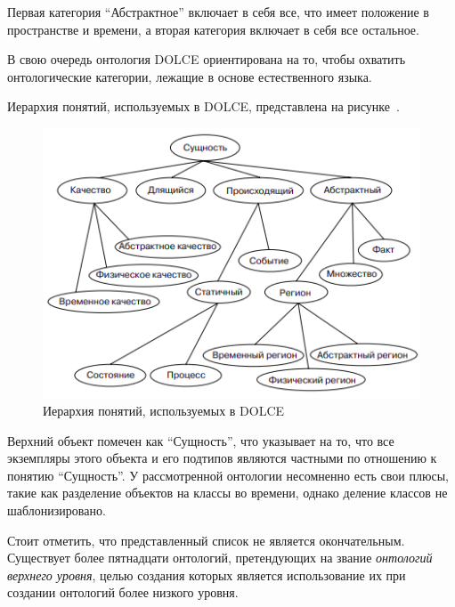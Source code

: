 Первая категория ``Абстрактное'' включает в себя все, что имеет положение в пространстве и времени, а вторая категория включает в себя все остальное.

В свою очередь онтология DOLCE ориентирована на то, чтобы охватить онтологические категории, лежащие в основе естественного языка.

Иерархия понятий, используемых в DOLCE, представлена на рисунке~\textit{}.

\begin{figure}[H]
	\includegraphics[scale=0.8]{author/part2/figures/chapter_kb/dolce.png}
	\caption{Иерархия понятий, используемых в DOLCE}
	\label{fig:dolce}
\end{figure}

Верхний объект помечен как ``Сущность'', что указывает на то, что все экземпляры этого объекта и его подтипов являются частными по отношению к понятию ``Сущность''. У рассмотренной онтологии несомненно есть свои плюсы, такие как разделение объектов на классы во времени, однако деление классов не шаблонизировано. 

Стоит отметить, что представленный список не является окончательным. Существует более пятнадцати онтологий, претендующих на звание \textit{онтологий верхнего уровня}, целью создания которых является использование их при создании онтологий более низкого уровня.

